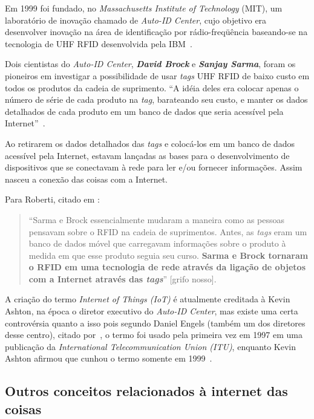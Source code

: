 \documentclass[pdftex, brazil, 12pt, twoside]{article}
\newcommand{\ingles}[1]{\textit{#1}}
\begin{document}
Em 1999 foi fundado, no \ingles{Massachusetts Institute of Technology} (MIT), um
laboratório de inovação chamado de \emph{Auto-ID Center}, cujo objetivo era
desenvolver inovação na área de identificação por rádio-freqüência baseando-se
na tecnologia de UHF RFID desenvolvida pela IBM~\citep{IEEEIoTDefinition}.

Dois cientistas do \ingles{Auto-ID Center},
\emph{\textbf{David Brock}} e \emph{\textbf{Sanjay Sarma}}, foram os pioneiros em investigar a possibilidade
de usar \ingles{tags} UHF RFID de baixo custo em todos os produtos da cadeia
de suprimento. ``A idéia deles era colocar apenas o número de série de cada produto
na \ingles{tag}, barateando seu custo, e manter os dados detalhados de cada
produto em um banco de dados que seria acessível pela Internet''~\citep[][p.\ 9]{IEEEIoTDefinition}.

Ao retirarem os dados detalhados das \ingles{tags} e colocá-los em um banco
de dados acessível pela Internet, estavam lançadas as bases para o desenvolvimento de
dispositivos que se conectavam à rede para ler e/ou fornecer informações.
Assim nasceu a conexão das coisas com a Internet.

Para Roberti, citado em \citet[][p.\ 9]{IEEEIoTDefinition}:
\begin{quote}
``Sarma e Brock
essencialmente mudaram a maneira como as pessoas pensavam sobre o RFID na
cadeia de suprimentos. Antes, as \ingles{tags} eram um banco de dados móvel
que carregavam informações sobre o produto à medida em que esse produto
seguia seu curso. \textbf{Sarma e Brock tornaram o RFID em uma tecnologia de rede
  através da ligação de objetos com a Internet através das \ingles{tags}}''
[grifo nosso].
\end{quote}

A criação do termo \ingles{Internet of Things (IoT)} é atualmente creditada à Kevin Ashton,
na época o diretor executivo do \ingles{Auto-ID Center}, mas existe uma certa
controvérsia quanto a isso pois segundo Daniel Engels (também um dos
diretores desse centro), citado por~\citet[][p.\ 10]{IEEEIoTDefinition},
o termo foi usado pela primeira vez em 1997 em uma publicação da
\ingles{International Telecommunication Union (ITU)}, enquanto Kevin Ashton afirmou
que cunhou o termo somente em 1999~\citep{AshtonIoT2009,PressIoT2014}.


\subsection{Outros conceitos relacionados à internet das coisas}
\label{o-que-e-iot-outros-tipos}
\end{document}

